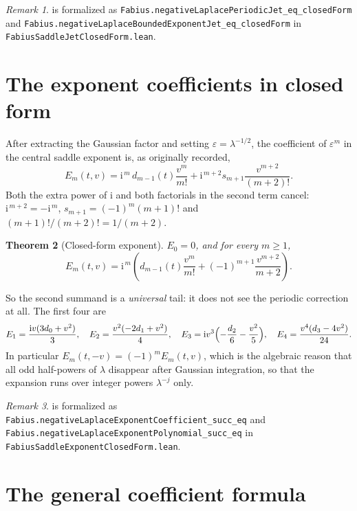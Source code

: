 \documentclass[11pt,oneside]{article}
\newtheorem{theorem}{Theorem}[section]
\theoremstyle{definition}
\theoremstyle{remark}
\newtheorem{remark}[theorem]{Remark}
\newcommand{\ii}{\mathrm i}
\begin{document}
\begin{remark}
 is formalized as
\lstinline[style=pseudo]{Fabius.negativeLaplacePeriodicJet_eq_closedForm} and
\lstinline[style=pseudo]{Fabius.negativeLaplaceBoundedExponentJet_eq_closedForm}
in \nolinkurl{FabiusSaddleJetClosedForm.lean}.
\end{remark}

\section{The exponent coefficients in closed form}\label{sec:exponent}

After extracting the Gaussian factor and setting $\varepsilon=\lambda^{-1/2}$,
the coefficient of $\varepsilon^m$ in the central saddle exponent is, as
originally recorded,
\[
  E_m(t,v)=\ii^{\,m}\,d_{m-1}(t)\frac{v^m}{m!}
    +\ii^{\,m+2}s_{m+1}\frac{v^{m+2}}{(m+2)!}.
\]
Both the extra power of $\ii$ and both factorials in the second term cancel:
$\ii^{\,m+2}=-\ii^{\,m}$, $s_{m+1}=(-1)^m(m+1)!$ and
$(m+1)!/(m+2)!=1/(m+2)$.

\begin{theorem}[Closed-form exponent]\label{thm:exponent}
$E_0=0$, and for every $m\ge1$,
\[
  E_m(t,v)=\ii^{\,m}\left(d_{m-1}(t)\frac{v^m}{m!}
    +(-1)^{m+1}\frac{v^{m+2}}{m+2}\right).
\]
\end{theorem}

So the second summand is a \emph{universal} tail: it does not see the periodic
correction at all.  The first four are
\[
  E_1=\frac{\ii v(3d_0+v^2)}{3},\quad
  E_2=\frac{v^2(-2d_1+v^2)}{4},\quad
  E_3=\ii v^3\Bigl(-\frac{d_2}{6}-\frac{v^2}{5}\Bigr),\quad
  E_4=\frac{v^4(d_3-4v^2)}{24}.
\]
In particular $E_m(t,-v)=(-1)^mE_m(t,v)$, which is the algebraic reason that
all odd half-powers of $\lambda$ disappear after Gaussian integration, so that
the expansion runs over integer powers $\lambda^{-j}$ only.

\begin{remark}
 is formalized as
\lstinline[style=pseudo]{Fabius.negativeLaplaceExponentCoefficient_succ_eq}
and
\lstinline[style=pseudo]{Fabius.negativeLaplaceExponentPolynomial_succ_eq}
in \nolinkurl{FabiusSaddleExponentClosedForm.lean}.
\end{remark}

\section{The general coefficient formula}\label{sec:general}
\end{document}

